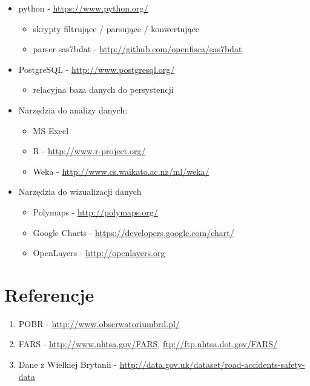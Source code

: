 \begin{itemize}
\item
  python - \url{https://www.python.org/}

  \begin{itemize}
  \itemsep1pt\parskip0pt
  \item
    skrypty filtrujące / parsujące / konwertujące\\
  \item
    parser sas7bdat - \url{http://github.com/openfisca/sas7bdat}\\
  \end{itemize}
\item
  PostgreSQL - \url{http://www.postgresql.org/}

  \begin{itemize}
  \itemsep1pt\parskip0pt
  \item
    relacyjna baza danych do persystencji\\
  \end{itemize}
\item
  Narzędzia do analizy danych:

  \begin{itemize}
  \itemsep1pt\parskip0pt
  \item
    MS Excel\\
  \item
    R - \url{http://www.r-project.org/}\\
  \item
    Weka - \url{http://www.cs.waikato.ac.nz/ml/weka/}\\
  \end{itemize}
\item
  Narzędzia do wizualizacji danych

  \begin{itemize}
  \itemsep1pt\parskip0pt
  \item
    Polymaps - \url{http://polymaps.org/}\\
  \item
    Google Charts - \url{https://developers.google.com/chart/}\\
  \item
    OpenLayers - \url{http://openlayers.org}
  \end{itemize}
\end{itemize}

\section{Referencje}\label{referencje}

\begin{enumerate}
\itemsep1pt\parskip0pt
\item
  POBR - \url{http://www.obserwatoriumbrd.pl/}\\
\item
  FARS - \url{http://www.nhtsa.gov/FARS},
  \url{ftp://ftp.nhtsa.dot.gov/FARS/}\\
\item
  Dane z Wielkiej Brytanii -
  \url{http://data.gov.uk/dataset/road-accidents-safety-data}
\end{enumerate}
